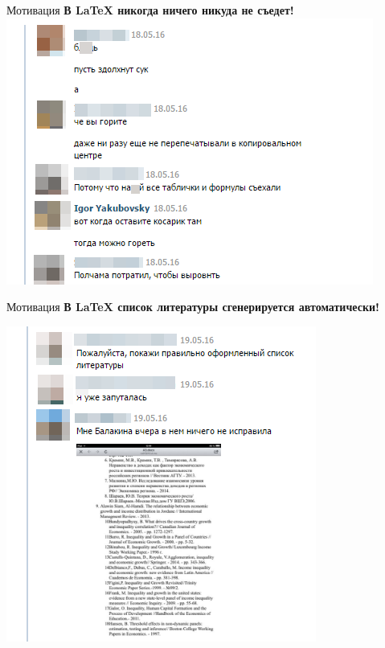 \documentclass[newPxFont]{beamer}
\begin{document}
\begin{frame}{Мотивация}
	\centering
    \alert{\textbf{В \LaTeX{} никогда ничего никуда не съедет!}}
    \includegraphics[height=0.68\textheight]{m1.png}
    
\end{frame}

\begin{frame}{Мотивация}
    \centering
    \alert{\textbf{В \LaTeX{} список литературы сгенерируется автоматически!}}
    
    \includegraphics[height=0.68\textheight]{m2.png}
\end{frame}
\end{document}

